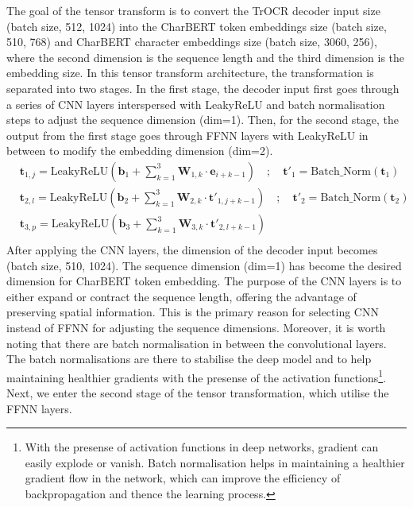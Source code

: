 The goal of the tensor transform is to convert the TrOCR decoder input size (batch size, 512, 1024) into the CharBERT token embeddings size (batch size, 510, 768) and CharBERT character embeddings size (batch size, 3060, 256), where the second dimension is the sequence length and the third dimension is the embedding size. In this tensor transform architecture, the transformation is separated into two stages. In the first stage, the decoder input first goes through a series of CNN layers interspersed with LeakyReLU and batch normalisation steps to adjust the sequence dimension (dim=1). Then, for the second stage, the output from the first stage goes through FFNN layers with LeakyReLU in between to modify the embedding dimension (dim=2).
\begin{equation} \label{eq:3_tensor_transform_cnn}
    \begin{split}
        &\mathbf{t}_{1, j} = \text{LeakyReLU}(\mathbf{b}_1 + \sum_{k=1}^{3}\mathbf{W}_{1,k}\cdot \mathbf{e}_{i+k-1})\quad;\quad \mathbf{t}'_1 = \text{Batch\_Norm}(\mathbf{t}_1)\\
        &\mathbf{t}_{2, l} = \text{LeakyReLU}(\mathbf{b}_2 + \sum_{k=1}^{3}\mathbf{W}_{2,k}\cdot \mathbf{t}'_{1,j+k-1})\quad;\quad \mathbf{t}'_2 = \text{Batch\_Norm}(\mathbf{t}_2)\\
        &\mathbf{t}_{3, p} = \text{LeakyReLU}(\mathbf{b}_3 + \sum_{k=1}^{3}\mathbf{W}_{3,k}\cdot \mathbf{t}'_{2,l+k-1})\quad\\
    \end{split}
\end{equation}
After applying the CNN layers, the dimension of the decoder input becomes (batch size, 510, 1024). The sequence dimension (dim=1) has become the desired dimension for CharBERT token embedding. The purpose of the CNN layers is to either expand or contract the sequence length, offering the advantage of preserving spatial information. This is the primary reason for selecting CNN instead of FFNN for adjusting the sequence dimensions. Moreover, it is worth noting that there are batch normalisation in between the convolutional layers. The batch normalisations are there to stabilise the deep model and to help maintaining healthier gradients with the presense of the activation functions\footnote{With the presense of activation functions in deep networks, gradient can easily explode or vanish. Batch normalisation helps in maintaining a healthier gradient flow in the network, which can improve the efficiency of backpropagation and thence the learning process.}. Next, we enter the second stage of the tensor transformation, which utilise the FFNN layers.
